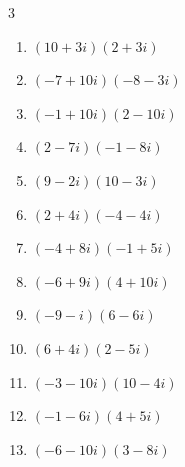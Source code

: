 \begin{multicols}{3}
\begin{enumerate}
        \phantom{$\displaystyle =32-59i$}

  \item $\displaystyle (10+3i)(2+3i)$

        \phantom{$\displaystyle =11+36i$}

  \item $\displaystyle (-7+10i)(-8-3i)$

        \phantom{$\displaystyle =86-59i$}

  \item $\displaystyle (-1+10i)(2-10i)$

        \phantom{$\displaystyle =98+30i$}

  \item $\displaystyle (2-7i)(-1-8i)$

        \phantom{$\displaystyle =-58-9i$}

  \item $\displaystyle (9-2i)(10-3i)$

        \phantom{$\displaystyle =84-47i$}

\columnbreak %

  \item $\displaystyle (2+4i)(-4-4i)$

        \phantom{$\displaystyle =8-24i$}

  \item $\displaystyle (-4+8i)(-1+5i)$

        \phantom{$\displaystyle =-36-28i$}

  \item $\displaystyle (-6+9i)(4+10i)$

        \phantom{$\displaystyle =-114-24i$}

  \item $\displaystyle (-9-i)(6-6i)$

        \phantom{$\displaystyle =-60+48i$}

  \item $\displaystyle (6+4i)(2-5i)$

        \phantom{$\displaystyle =32-22i$}

  \item $\displaystyle (-3-10i)(10-4i)$

        \phantom{$\displaystyle =-70-88i$}

  \item $\displaystyle (-1-6i)(4+5i)$

        \phantom{$\displaystyle =26-29i$}

  \item $\displaystyle (-6-10i)(3-8i)$


\end{enumerate}
\end{multicols}
